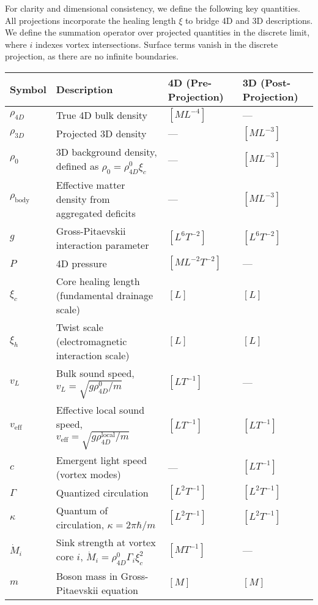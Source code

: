 For clarity and dimensional consistency, we define the following key quantities. All projections incorporate the healing length $\xi$ to bridge 4D and 3D descriptions. We define the summation operator over projected quantities in the discrete limit, where $i$ indexes vortex intersections. Surface terms vanish in the discrete projection, as there are no infinite boundaries.

\begin{table}[H]
\centering
\begin{tabularx}{\textwidth}{|l|Y|l|l|}
\hline
Symbol & Description & 4D (Pre-Projection) & 3D (Post-Projection) \\
\hline
$\rho_{4D}$ & True 4D bulk density & $[M L^{-4}]$ & --- \\
\hline
$\rho_{3D}$ & Projected 3D density & --- & $[M L^{-3}]$ \\
\hline
$\rho_0$ & 3D background density, defined as $\rho_0 = \rho_{4D}^0 \xi_c$ & --- & $[M L^{-3}]$ \\
\hline
$\rho_{\text{body}}$ & Effective matter density from aggregated deficits & --- & $[M L^{-3}]$ \\
\hline
$g$ & Gross-Pitaevskii interaction parameter & $[L^6 T^{-2}]$ & $[L^6 T^{-2}]$ \\
\hline
$P$ & 4D pressure & $[M L^{-2} T^{-2}]$ & --- \\
\hline
$\xi_c$ & Core healing length (fundamental drainage scale) & $[L]$ & $[L]$ \\
\hline
$\xi_h$ & Twist scale (electromagnetic interaction scale) & $[L]$ & $[L]$ \\
\hline
$v_L$ & Bulk sound speed, $v_L = \sqrt{g \rho_{4D}^0 / m}$ & $[L T^{-1}]$ & --- \\
\hline
$v_{\text{eff}}$ & Effective local sound speed, $v_{\text{eff}} = \sqrt{g \rho_{4D}^{\text{local}} / m}$ & $[L T^{-1}]$ & $[L T^{-1}]$ \\
\hline
$c$ & Emergent light speed (vortex modes) & --- & $[L T^{-1}]$ \\
\hline
$\Gamma$ & Quantized circulation & $[L^2 T^{-1}]$ & $[L^2 T^{-1}]$ \\
\hline
$\kappa$ & Quantum of circulation, $\kappa = 2 \pi \hbar / m$ & $[L^2 T^{-1}]$ & $[L^2 T^{-1}]$ \\
\hline
$\dot{M}_i$ & Sink strength at vortex core $i$, $\dot{M}_i = \rho_{4D}^0 \Gamma_i \xi_c^2$ & $[M T^{-1}]$ & --- \\
\hline
$m$ & Boson mass in Gross-Pitaevskii equation & $[M]$ & $[M]$ \\

\end{tabularx}
\end{table}
